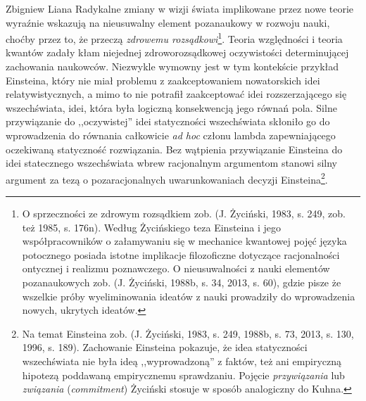 \begin{artplenv}{Zbigniew Liana}
Radykalne zmiany w wizji świata implikowane przez nowe teorie wyraźnie wskazują na nieusuwalny element pozanaukowy w
rozwoju nauki, choćby przez to, że przeczą \textit{zdrowemu rozsądkowi}\footnote{O sprzeczności ze zdrowym rozsądkiem
	zob. \label{ref:RND3LfNDVSWRv}(J. Życiński, 1983, s. 249, zob. też 1985, s. 176n). Według Życińskiego teza Einsteina i
	jego współpracowników o załamywaniu się w mechanice kwantowej pojęć języka potocznego posiada istotne implikacje
	filozoficzne dotyczące racjonalności ontycznej i realizmu poznawczego. O nieusuwalności z nauki elementów pozanaukowych
	zob. \label{ref:RNDhn4h2RTiN2}(J. Życiński, 1988b, s. 34, 2013, s. 60), gdzie pisze że wszelkie próby wyeliminowania
	ideatów z nauki prowadziły do wprowadzenia nowych, ukrytych ideatów.}. Teoria względności i teoria kwantów zadały kłam
niejednej zdroworozsądkowej oczywistości determinującej zachowania naukowców. Niezwykle wymowny jest w tym kontekście 
przykład Einsteina, który nie miał problemu z zaakceptowaniem nowatorskich idei relatywistycznych, a mimo to nie
potrafił zaakceptować idei rozszerzającego się wszechświata, idei, która była logiczną konsekwencją jego równań pola.
Silne przywiązanie do ,,oczywistej'' idei statyczności wszechświata skłoniło go do wprowadzenia do równania całkowicie
\textit{ad hoc} członu lambda zapewniającego oczekiwaną statyczność rozwiązania. Bez wątpienia przywiązanie Einsteina do
idei statecznego wszechświata wbrew racjonalnym argumentom stanowi silny argument za tezą o pozaracjonalnych
uwarunkowaniach decyzji Einsteina\footnote{Na temat Einsteina zob. \label{ref:RNDOEPytE2GkR}(J. Życiński, 1983, s. 249,
	1988b, s. 73, 2013, s. 130, 1996, s. 189). Zachowanie Einsteina pokazuje, że idea statyczności wszechświata nie była
	ideą ,,wyprowadzoną'' z faktów, też ani empiryczną hipotezą poddawaną empirycznemu sprawdzaniu. Pojęcie
	\textit{przywiązania} lub\textit{ związania }(\textit{commitment}) Życiński stosuje w sposób analogiczny do Kuhna.}.


\end{artplenv}
